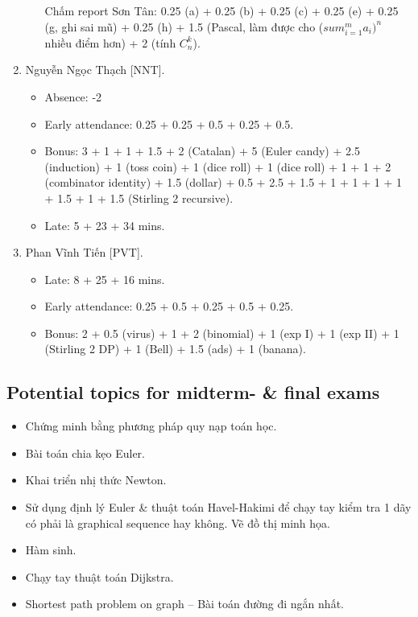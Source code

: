\documentclass{article}
\begin{document}
\begin{enumerate}
\begin{itemize}
		Chấm report Sơn Tân: 0.25 (a) + 0.25 (b) + 0.25 (c) + 0.25 (e) + 0.25 (g, ghi sai mũ) + 0.25 (h) + 1.5 (Pascal, làm được cho ($sum_{i=1}^m a_i)^n$ nhiều điểm hơn) + 2 (tính $C_n^k$).
	\end{itemize}
	\item {\sc Nguyễn Ngọc Thạch [NNT].}
	\begin{itemize}
		\item Absence: -2
		\item Early attendance: 0.25 + 0.25 + 0.5 + 0.25 + 0.5.
		\item Bonus: 3 + 1 + 1 + 1.5 + 2 (Catalan) + 5 (Euler candy) + 2.5 (induction) + 1 (toss coin) + 1 (dice roll) + 1 (dice roll) + 1 + 1 + 2 (combinator identity) + 1.5 (dollar) + 0.5 + 2.5 + 1.5 + 1 + 1 + 1 + 1 + 1.5 + 1 + 1.5 (Stirling 2 recursive).
		\item Late: 5 + 23 + 34 mins.
	\end{itemize}
	\item {\sc Phan Vĩnh Tiến [PVT].}
	\begin{itemize}
		\item Late: 8 + 25 + 16 mins.
		\item Early attendance: 0.25 + 0.5 + 0.25 + 0.5 + 0.25.
		\item Bonus: 2 + 0.5 (virus) + 1 + 2 (binomial) + 1 (exp I) + 1 (exp II) + 1 (Stirling 2 DP) + 1 (Bell) + 1.5 (ads) + 1 (banana).
	\end{itemize}
\end{enumerate}


\subsection{Potential topics for midterm- \& final exams}

\begin{itemize}
	\item Chứng minh bằng phương pháp quy nạp toán học.
	\item Bài toán chia kẹo Euler.
	\item Khai triển nhị thức Newton.
	\item Sử dụng định lý Euler \& thuật toán Havel-Hakimi để chạy tay kiểm tra 1 dãy có phải là graphical sequence hay không. Vẽ đồ thị minh họa.
	\item Hàm sinh.
	\item Chạy tay thuật toán Dijkstra.
	\item Shortest path problem on graph -- Bài toán đường đi ngắn nhất.
\end{itemize}
\end{document}
